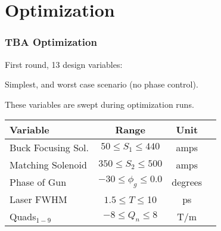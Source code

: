 \documentclass[professionalfonts,t]{beamer}
\begin{document}
\section{Optimization}
\begin{frame}
\frametitle{TBA Optimization}
	\vspace{-0.75em}
	\begin{tikzpicture}[scale=\textwidth/26cm, text=black]
	
	\end{tikzpicture}

\vspace{-1em}
First round, 13 design variables:

Simplest, and worst case scenario (no phase control).

These variables are swept during optimization runs.
\begin{table}[hbt] 
	\centering
	\begin{tabular}{ l *{3}{c}}
		\toprule
		\textbf{Variable} & \textbf{Range} & \textbf{Unit} \\
		\midrule
		Buck Focusing Sol. &  $ 50 \le S_1 \le 440$ & amps \\
		Matching Solenoid & $ 350 \le S_2 \le 500$  & amps \\
		Phase of Gun & $-30 \le \phi_g \le 0.0$  & degrees \\
		Laser FWHM & $1.5 \le T \le $10  & ps \\
		Quads$_{1-9}$ & $-8 \le Q_n \le 8$  & T/m \\
		\bottomrule	
	\end{tabular}

	
\end{table}
\end{frame}
\end{document}
